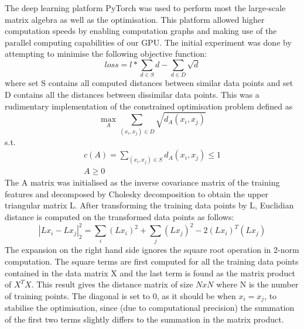 \documentclass[10pt,technote]{IEEEtran}
\begin{document}
The deep learning platform PyTorch was used to perform most the large-scale matrix algebra as well as the optimisation. This platform allowed higher computation speeds by enabling computation graphs and making use of the parallel computing capabilities of our GPU.
The initial experiment was done by attempting to minimise the following objective function: \begin{equation}
    loss = l*\sum_{d \in S}d -  \sum_{d \in D}\sqrt{d}
\end{equation}
where set S contains all computed distances between similar data points and set D contains all the distances between dissimilar data points. This was a rudimentary implementation of the constrained optimisation problem defined as
\begin{equation}
    \max_{A}\sum_{(x_i, x_j) \in D}\sqrt{d_A (x_i, x_j)}
\end{equation}
s.t.
\begin{equation}
    \begin{aligned}
        c(A) = \sum_{(x_i, x_j) \in S}d_A (x_i, x_j) \le 1 \\
        A \ge 0
    \end{aligned}
\end{equation}
The A matrix was initialised as the 
inverse covariance matrix of the training features and decomposed by Cholesky decomposition to obtain the upper triangular matrix L. After transforming the training data points by L, Euclidian distance is computed on the transformed data points as follows:
\begin{equation}
    |Lx_i - Lx_j|_2^2 = \sum_{i}(Lx_i)^2 + \sum_{j}(Lx_j)^2 - 2(Lx_i)^T(Lx_j)
\end{equation}
The expansion on the right hand side ignores the square root operation in 2-norm computation. The square terms are first computed for all the training data points contained in the data matrix X and the last term is found as the matrix product of $X^TX$. This result gives the distance matrix of size $NxN$ where N is the number of training points. The diagonal is set to 0, as it should be when $x_i = x_j$, to stabilise the optimisation, since (due to computational precision) the summation of the first two terms slightly differs to the summation in the matrix product. 




\end{document}
